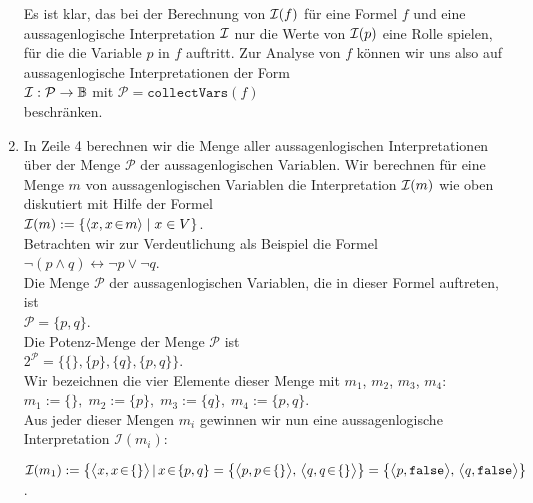 \begin{enumerate}
      Es ist klar, das bei der Berechnung von ${\cal I}(f)$ f\"{u}r eine Formel $f$
      und eine aussagenlogische Interpretation ${\cal I}$ nur die Werte von
      ${\cal I}(p)$ eine Rolle spielen, f\"{u}r die die Variable $p$ in $f$
      auftritt.  Zur Analyse von $f$ k\"{o}nnen wir uns also auf aussagenlogische 
      Interpretationen  der Form \\[0.2cm]
      \hspace*{1.3cm} 
      ${\cal I}:\mathcal{P} \rightarrow \mathbb{B}$ \quad mit \quad $\mathcal{P} = \mathtt{collectVars}(f)$ 
      \\[0.2cm]
      beschr\"{a}nken.
\item In Zeile 4 berechnen wir die Menge aller aussagenlogischen
      Interpretationen \"{u}ber der Menge $\mathcal{P}$ der aussagenlogischen Variablen.  
      Wir berechnen f\"{u}r eine Menge $m$ von aussagenlogischen Variablen
      die Interpretation ${\cal I}(m)$ wie oben diskutiert mit Hilfe der Formel
      \\[0.2cm]
      \hspace*{1.3cm}
      ${\cal I}(m) := \{ \pair(x, x \!\in\! m) \mid x \in V \}$.  
      \\[0.2cm]
      Betrachten wir zur Verdeutlichung als Beispiel die Formel \\[0.2cm]
      \hspace*{1.3cm} $\neg (p \wedge q) \leftrightarrow \neg p \vee \neg q$. \\[0.2cm]
      Die Menge $\mathcal{P}$ der aussagenlogischen Variablen, die in dieser Formel auftreten,
      ist \\[0.2cm]
      \hspace*{1.3cm} $\mathcal{P} = \{ p, q \}$. \\[0.2cm]
      Die Potenz-Menge der Menge $\mathcal{P}$ ist \\[0.2cm]
      \hspace*{1.3cm} $2^\mathcal{P} = \bigl\{ \{\}, \{p\}, \{q\}, \{p,q\} \bigr\}$. \\[0.2cm]
      Wir bezeichnen die vier Elemente dieser Menge mit $m_1$, $m_2$, $m_3$, $m_4$: \\[0.2cm]
      \hspace*{1.3cm} $m_1 := \{\},\; m_2 :=\{p\},\; m_3 :=\{q\},\; m_4 :=\{p,q\}$. \\[0.2cm]
      Aus jeder dieser Mengen $m_i$ gewinnen wir nun eine aussagenlogische Interpretation 
      $\mathcal{I}(m_i)$: 

      ${\cal I}(m_1) := \bigl\{ \bigl\langle x, x \!\in\! \{\} \bigl\rangle\, |\, x \!\in\! \{p,q\} = \bigl\{ \bigl\langle p, p \!\in\! \{\} \bigl\rangle,\, \bigl\langle q, q \!\in\! \{\} \bigl\rangle \bigr\} = \bigl\{ \bigl\langle p, \mathtt{false} \bigl\rangle,\, \bigl\langle q, \mathtt{false} \bigl\rangle \bigr\}$.


\end{enumerate}
